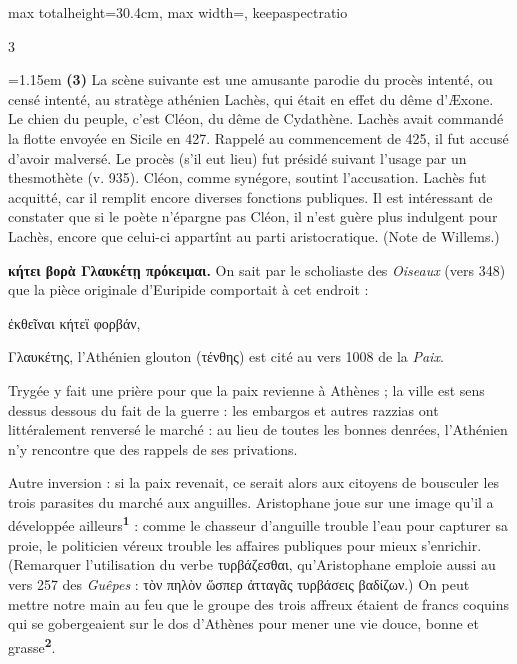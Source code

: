 \documentclass[11pt,twoside]{book}
\newcommand{\italique}[1]{\textit{#1}}
\newcommand{\citComm}[1]{\begin{quoting}[vskip=0.4pt,leftmargin=0.7em,rightmargin=0.2em]#1\end{quoting}}
\newcommand{\marqueur}[1]{\textsuperscript{\color{rubricRed}\textbf{#1}}}
\begin{document}
\begin{adjustbox}{max totalheight=30.4cm, max width=\textwidth, keepaspectratio}
\begin{minipage}{\textwidth}
{\begin{multicols}{3}
\par\vspace{1.5pt}
\noindent\hangindent=1.15em {\color{sepiaNote}\textbf{(3)}} La scène suivante est une amusante parodie du procès intenté, ou censé intenté, au stratège athénien Lachès, qui était en effet du dême d'Æxone. Le chien du peuple, c'est Cléon, du dême de Cydathène. Lachès avait commandé la flotte envoyée en Sicile en 427. Rappelé au commencement de 425, il fut accusé d'avoir malversé. Le procès (s'il eut lieu) fut présidé suivant l'usage par un thesmothète (v. 935). Cléon, comme synégore, soutint l'accusation. Lachès fut acquitté, car il remplit encore diverses fonctions publiques. Il est intéressant de constater que si le poète n'épargne pas Cléon, il n'est guère plus indulgent pour Lachès, encore que celui-ci appartînt au parti aristocratique. (Note de Willems.)
\par\vspace{1.5pt}
 \textbf{κήτει βορὰ Γλαυκέτῃ πρόκειμαι.} On sait par le scholiaste des \italique{Oiseaux} (vers 348) que la pièce originale d'Euripide comportait à cet endroit :
\citComm{ἐκθεῖναι κήτεϊ φορβάν,}
\par\vspace{1.5pt}
\noindent Γλαυκέτης, l'Athénien glouton (τένθης) est cité au vers 1008 de la \italique{Paix}.
\par\vspace{1.5pt}
\noindent Trygée y fait une prière pour que la paix revienne à Athènes ; la ville est sens dessus dessous du fait de la guerre : les embargos et autres razzias ont littéralement renversé le marché : au lieu de toutes les bonnes denrées, l'Athénien n'y rencontre que des rappels de ses privations.
\par\vspace{1.5pt}
\noindent Autre inversion : si la paix revenait, ce serait alors aux citoyens de bousculer les trois parasites du marché aux anguilles. Aristophane joue sur une image qu'il a développée ailleurs\marqueur{1} : comme le chasseur d'anguille trouble l'eau pour capturer sa proie, le politicien véreux trouble les affaires publiques pour mieux s'enrichir. (Remarquer l'utilisation du verbe τυρβάζεσθαι, qu'Aristophane emploie aussi au vers 257 des \italique{Guêpes} : τὸν πηλὸν ὥσπερ ἀτταγᾶς τυρβάσεις βαδίζων.)  On peut mettre notre main au feu que le groupe des trois affreux étaient de francs coquins qui se gobergeaient sur le dos d'Athènes pour mener une vie douce, bonne et grasse\marqueur{2}.
\par\vspace{1.5pt}

\end{multicols}}
\end{minipage}
\end{adjustbox}
\end{document}
